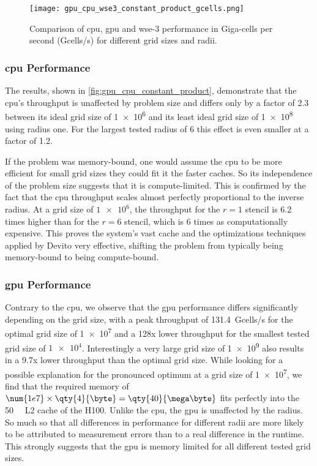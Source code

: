 \begin{figure}[h]
    \centering
    \texttt{[image: gpu\_cpu\_wse3\_constant\_product\_gcells.png]}
    \caption{Comparison of \ac{cpu}, \ac{gpu} and \ac{wse}-3 performance in Giga-cells per second (Gcells/s) for different grid sizes and radii.}
    \label{fig:gpu_cpu_constant_product}
\end{figure}

\subsubsection{\ac{cpu} Performance}
The results, shown in \autoref{fig:gpu_cpu_constant_product}, demonstrate that the \ac{cpu}'s throughput is unaffected by problem size and differs only by a factor of \num{2.3} between its ideal grid size of \num{1e6} and its least ideal grid size of \num{1e8} using radius one. For the largest tested radius of \num{6} this effect is even smaller at a factor of \num{1.2}.

If the problem was memory-bound, one would assume the \ac{cpu} to be more efficient for small grid sizes they could fit it the faster caches. So its independence of the problem size suggests that it is compute-limited.
This is confirmed by the fact that the \ac{cpu} throughput scales almost perfectly proportional to the inverse radius.
At a grid size of $\num{1e6}$, the throughput for the $r=1$ stencil is \num{6.2} times higher than for the $r=6$ stencil, which is \num{6} times as computationally expensive. This proves the system's vast cache and the optimizations techniques applied by Devito very effective, shifting the problem from typically being memory-bound to being compute-bound. 

\subsubsection{\ac{gpu} Performance}
Contrary to the \ac{cpu}, we observe that the \ac{gpu} performance differs significantly depending on the grid size, with a peak throughput of \qty{131.4}{Gcells/s} for the optimal grid size of \num{1e7} and a 128x lower throughput for the smallest tested grid size of $\num{1e4}$. Interestingly a very large grid size of \num{1e9} also results in a 9.7x lower throughput than the optimal grid size. While looking for a possible explanation for the pronounced optimum at a grid size of \num{1e7}, we find that the required memory of $\num{1e7}\times\qty{4}{\byte}=\qty{40}{\mega\byte}$ fits perfectly into the \qty{50}{\mega\byte} L2 cache of the H100.
Unlike the \ac{cpu}, the \ac{gpu} is unaffected by the radius. So much so that all differences in performance for different radii are more likely to be attributed to measurement errors than to a real difference in the runtime. This strongly suggests that the \ac{gpu} is memory limited for all different tested grid sizes.

